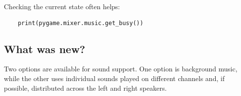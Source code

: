 Checking the current state often helps:

\lstset{firstnumber=1}
\begin{lstlisting}
	print(pygame.mixer.music.get_busy())
\end{lstlisting}
\subsection{What was new?}
\begin{hintbox}
	Two options are available for sound support. One option is background music, while the other uses individual sounds played on different channels and, if possible, distributed across the left and right speakers.
\end{hintbox}


